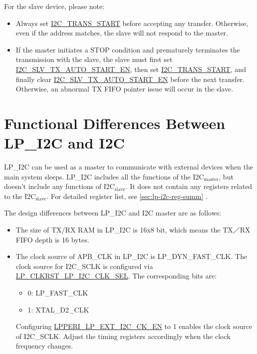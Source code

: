\documentclass[main\_\_EN.tex]{subfiles}
\begin{document}
For the slave device, please note:

\begin{itemize}
    \item Always set \hyperref[fielddesc:I2CTRANSSTART]{I2C\_TRANS\_START} before accepting any transfer. Otherwise, even if the address matches, the slave will not respond to the master.
    \item If the master initiates a STOP condition and prematurely terminates the transmission with the slave, the slave must first set \hyperref[fielddesc:I2CSLVTXAUTOSTARTEN]{I2C\_SLV\_TX\_AUTO\_START\_EN}, then set \hyperref[fielddesc:I2CTRANSSTART]{I2C\_TRANS\_START}, and finally clear \hyperref[fielddesc:I2CSLVTXAUTOSTARTEN]{I2C\_SLV\_TX\_AUTO\_START\_EN} before the next transfer. Otherwise, an abnormal TX FIFO pointer issue will occur in the slave.
\end{itemize}


\section{Functional Differences Between LP\_I2C and I2C}

LP\_I2C can be used as a master to communicate with external devices when the main system sleeps. LP\_I2C includes all the functions of the \chipname{} I2C$_\text{master}$, but doesn't include any functions of \chipname{} I2C$_\text{slave}$. It does not contain any registers related to the I2C$_\text{slave}$. For detailed register list, see \ref{sec:lp-i2c-reg-summ} .

The design differences between LP\_I2C and I2C master are as follows:

\begin{itemize}
\item The size of TX/RX RAM in LP\_I2C is 16x8 bit, which means the TX／RX FIFO depth is 16 bytes.
\item The clock source of APB\_CLK in LP\_I2C is LP\_DYN\_FAST\_CLK. The clock source for I2C\_SCLK is configured via \hyperref[fielddesc:LPCLKRSTLPI2CCLKSEL]{LP\_CLKRST\_LP\_I2C\_CLK\_SEL}. The corresponding bits are:
    \begin{itemize}
        \item 0: LP\_FAST\_CLK
        \item 1: XTAL\_D2\_CLK
    \end{itemize}
    Configuring \hyperref[fielddesc:LPPERILPEXTI2CCKEN]{LPPERI\_LP\_EXT\_I2C\_CK\_EN} to 1 enables the clock source of I2C\_SCLK. Adjust the timing registers accordingly when the clock frequency changes.
\end{itemize}
\end{document}
